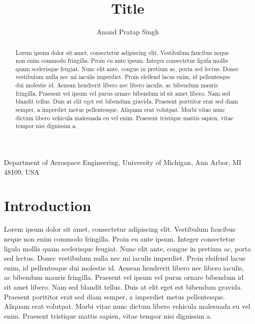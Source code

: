 \documentclass[referee]{jfm}
\begin{document}

\title{Title}

\author
 {
 Anand Pratap Singh
 }

\affiliation
{
  Department of Aerospace Engineering, University of Michigan, Ann Arbor, MI 48109, USA
}

\maketitle

\begin{abstract}
Lorem ipsum dolor sit amet, consectetur adipiscing elit. Vestibulum faucibus neque non enim commodo fringilla. Proin eu ante ipsum. Integer consectetur ligula mollis quam scelerisque feugiat. Nunc elit ante, congue in pretium ac, porta sed lectus. Donec vestibulum nulla nec mi iaculis imperdiet. Proin eleifend lacus enim, id pellentesque dui molestie id. Aenean hendrerit libero nec libero iaculis, ac bibendum mauris fringilla. Praesent vel ipsum vel purus ornare bibendum id sit amet libero. Nam sed blandit tellus. Duis at elit eget est bibendum gravida. Praesent porttitor erat sed diam semper, a imperdiet metus pellentesque. Aliquam erat volutpat. Morbi vitae nunc dictum libero vehicula malesuada eu vel enim. Praesent tristique mattis sapien, vitae tempor nisi dignissim a.
\end{abstract}

\section{Introduction}
Lorem ipsum dolor sit amet, consectetur adipiscing elit. Vestibulum faucibus neque non enim commodo fringilla. Proin eu ante ipsum. Integer consectetur ligula mollis quam scelerisque feugiat. Nunc elit ante, congue in pretium ac, porta sed lectus. Donec vestibulum nulla nec mi iaculis imperdiet. Proin eleifend lacus enim, id pellentesque dui molestie id. Aenean hendrerit libero nec libero iaculis, ac bibendum mauris fringilla. Praesent vel ipsum vel purus ornare bibendum id sit amet libero. Nam sed blandit tellus. Duis at elit eget est bibendum gravida. Praesent porttitor erat sed diam semper, a imperdiet metus pellentesque. Aliquam erat volutpat. Morbi vitae nunc dictum libero vehicula malesuada eu vel enim. Praesent tristique mattis sapien, vitae tempor nisi dignissim a.
\end{document}
